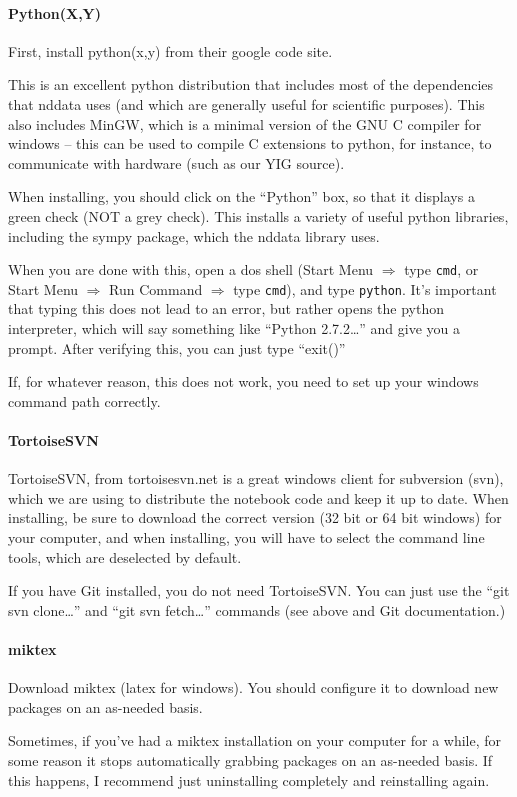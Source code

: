 \paragraph{Python(X,Y)}
First, install python(x,y) from their google code site.
\begin{inplacenotebox}
    This is an excellent python distribution that includes most of
    the dependencies that nddata uses (and which are generally useful for scientific purposes).
    This also includes MinGW, which is a minimal version of the
    GNU C compiler for windows -- this can be used to compile
    C extensions to python, for instance, to communicate with hardware
    (such as our YIG source).
\end{inplacenotebox}
When installing, you should click on the ``Python'' box,
    so that it displays a green check (NOT a grey check).
This installs a variety of useful python libraries,
    including the sympy package, which the nddata library uses.

When you are done with this, open a dos shell (Start Menu $\Rightarrow$ type \texttt{cmd}, or Start Menu $\Rightarrow$ Run Command $\Rightarrow$ type \texttt{cmd}),
    and type \texttt{python}.
It's important that typing this does not lead to an error,
    but rather opens the python interpreter,
    which will say something like ``Python 2.7.2\ldots'' and give you a prompt.
After verifying this, you can just type ``exit()''
\begin{inplacenotebox}
    If, for whatever reason, this does not work,
    you need to set up your windows command path correctly.
\end{inplacenotebox}
\paragraph{TortoiseSVN}
TortoiseSVN, from tortoisesvn.net is a great windows
    client for subversion (svn),
    which we are using to distribute the notebook code and keep
    it up to date.
When installing, be sure to download the correct version (32 bit or 64 bit windows) for your computer, and when installing, you will have to select the command line tools, which are deselected by default.
\begin{inplacenotebox}
If you have Git installed, you do not need TortoiseSVN.
You can just use the ``git svn clone\ldots'' and ``git svn fetch\ldots''
    commands (see above and Git documentation.)
\end{inplacenotebox}
\paragraph{miktex}
Download miktex (latex for windows).
You should configure it to download new packages on an as-needed basis.
\begin{inplacenotebox}
    Sometimes,
    if you've had a miktex installation on your computer for a while,
    for some reason it stops automatically grabbing packages on an as-needed
    basis.
    If this happens, I recommend just uninstalling completely and reinstalling
    again.
\end{inplacenotebox}
